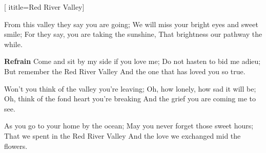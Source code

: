  [
ititle={Red River Valley}]

\beginverse
From this valley they say you are going;
We will miss your bright eyes and sweet smile;
For they say, you are taking the sunshine,
That brightness our pathway the while.
\endverse

\beginchorus
\textbf{Refrain}
Come and sit by my side if you love me;
Do not hasten to bid me adieu;
But remember the Red River Valley
And the one that has loved you so true.
\endchorus

\beginverse
Won't you think of the valley you're leaving;
Oh, how lonely, how sad it will be;
Oh, think of the fond heart you're breaking
And the grief you are coming me to see.
\endverse

\beginverse
As you go to your home by the ocean;
May you never forget those sweet hours;
That we spent in the Red River Valley
And the love we exchanged mid the flowers.
\endverse
\endsong